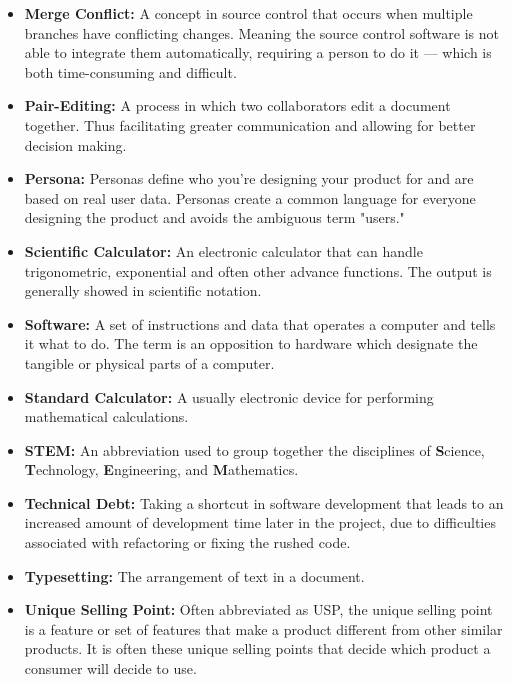 \documentclass[11pt,onside]{report}
\begin{document}
\begin{itemize}
    \item \textbf{Merge Conflict:} A concept in source control that occurs when multiple branches have conflicting changes. Meaning the source control software is not able to integrate them automatically, requiring a person to do it — which is both time-consuming and difficult.
    
    \item \textbf{Pair-Editing:} A process in which two collaborators edit a document together. Thus facilitating greater communication and allowing for better decision making.
    
    \item \textbf{Persona:} Personas define who you're designing your product for and are based on real user data. Personas create a common language for everyone designing the product and avoids the ambiguous term "users." \cite{personas}
    
    \item \textbf{Scientific Calculator:}  An electronic calculator that can handle trigonometric, exponential and often other advance functions. The output is generally showed in scientific notation. \cite{scientific}
    
    \item \textbf{Software:} A set of instructions and data that operates a computer and tells it what to do. \cite{software}  The term is an opposition to hardware which designate the tangible or physical parts of a computer. 
    
    \item \textbf{Standard Calculator:} A usually electronic device for performing mathematical calculations. \cite{calculator}
    
    \item \textbf{STEM:} An abbreviation used to group together the disciplines of \textbf{S}cience, \textbf{T}echnology, \textbf{E}ngineering, and \textbf{M}athematics. \cite{stem}
    
    \item \textbf{Technical Debt:} Taking a shortcut in software development that leads to an increased amount of development time later in the project, due to difficulties associated with refactoring or fixing the rushed code.\cite{technical-debt}
    
    \item \textbf{Typesetting:} The arrangement of text in a document. \cite{typesetting}
    
    \item \textbf{Unique Selling Point:} Often abbreviated as USP, the unique selling point is a feature or set of features that make a product different from other similar products. It is often these unique selling points that decide which product a consumer will decide to use. \cite{usp}
    

\end{itemize}
\end{document}
